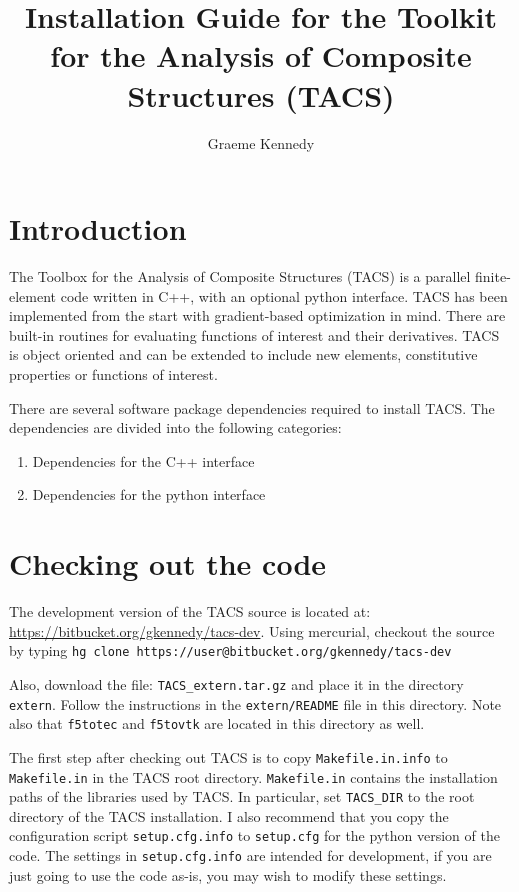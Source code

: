 \documentclass{article}
\title{Installation Guide for the Toolkit for the Analysis of Composite Structures (TACS)}
\date{}
\author{Graeme Kennedy}
\begin{document}
\maketitle

\section{Introduction}

The Toolbox for the Analysis of Composite Structures (TACS) is a
parallel finite-element code written in C++, with an optional python
interface. TACS has been implemented from the start with gradient-based
optimization in mind. There are built-in routines for evaluating
functions of interest and their derivatives. TACS is object oriented
and can be extended to include new elements, constitutive properties
or functions of interest.

There are several software package dependencies required to install
TACS. The dependencies are divided into the following categories:
\begin{enumerate}
\item Dependencies for the C++ interface
\item Dependencies for the python interface
\end{enumerate}

\section{Checking out the code}

The development version of the TACS source is located at:
\url{https://bitbucket.org/gkennedy/tacs-dev}. Using mercurial, checkout the
source by typing \texttt{hg clone
  https://user@bitbucket.org/gkennedy/tacs-dev}

Also, download the file: \texttt{TACS\_extern.tar.gz} and place it in
the directory \texttt{extern}. Follow the
instructions in the \texttt{extern/README} file in this directory. Note also that
\texttt{f5totec} and \texttt{f5tovtk} are located in this directory as well.

The first step after checking out TACS is to copy
\texttt{Makefile.in.info} to \texttt{Makefile.in} in the TACS root
directory. \texttt{Makefile.in} contains the installation paths of the
libraries used by TACS. In particular, set \texttt{TACS\_DIR} to the
root directory of the TACS installation. I also recommend that you copy
the configuration script \texttt{setup.cfg.info} to \texttt{setup.cfg} 
for the python version of the code. The settings in \texttt{setup.cfg.info} 
are intended for development, if you are just going to use the code as-is,
you may wish to modify these settings.
\end{document}
